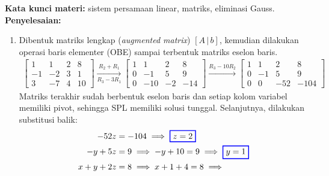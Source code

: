 \documentclass[10pt,openany,a4paper]{article}
\theoremstyle{definition}
\theoremstyle{definition}
\theoremstyle{plain}
\newenvironment{jawab}[2][tes]{%
\par\noindent\textbf{Kata kunci materi:} #1.\\
\textbf{Penyelesaian:} #2%
}{}
\begin{document}
\begin{enumerate}
\begin{jawab}[sistem persamaan linear, matriks, eliminasi Gauss]
{\begin{enumerate}
\begin{align*}
{                =
                \underbrace{\begin{bmatrix}
                    8\\ 1\\ 10
                \end{bmatrix}}_{b}}\color{oldcolor}.
            \end{align*}
            \item Dibentuk matriks lengkap (\textit{augmented matrix}) $[A\,|\,b]$, kemudian dilakukan operasi baris elementer (OBE) sampai terbentuk matriks eselon baris.
            \begin{align*}
                \left[\begin{array}{ccc|c}
                    1 & 1 & 2 & 8\\
                    -1 & -2 & 3 & 1\\
                    3 & -7 & 4 & 10
                \end{array}\right]
                \xrightarrow[R_3 - 3R_1]{R_2 + R_1}
                \left[\begin{array}{ccc|c}
                    1 & 1 & 2 & 8\\
                    0 & -1 & 5 & 9\\
                    0 & -10 & -2 & -14
                \end{array}\right]
                \xrightarrow{R_3 - 10R_2}
                \left[\begin{array}{ccc|c}
                    1 & 1 & 2 & 8\\
                    0 & -1 & 5 & 9\\
                    0 & 0 & -52 & -104
                \end{array}\right]
            \end{align*}
            Matriks terakhir sudah berbentuk eselon baris dan setiap kolom variabel memiliki pivot, sehingga SPL memiliki solusi tunggal. Selanjutnya, dilakukan substitusi balik:
            \begin{align*}
                -52z &= -104 \implies \colorlet{oldcolor}{.}
        \color{blue}
        \setlength{\fboxrule}{1pt} \boxed{\color{oldcolor}z = 2}\color{oldcolor}\\
                -y + 5z &= 9 \implies -y + 10 = 9 \implies \colorlet{oldcolor}{.}
        \color{blue}
        \setlength{\fboxrule}{1pt} \boxed{\color{oldcolor}y = 1}\color{oldcolor}\\
                x + y + 2z &= 8 \implies x + 1 + 4 = 8 \implies \colorlet{oldcolor}{.}

\end{align*}
\end{enumerate}}
\end{jawab}
\end{enumerate}
\end{document}
